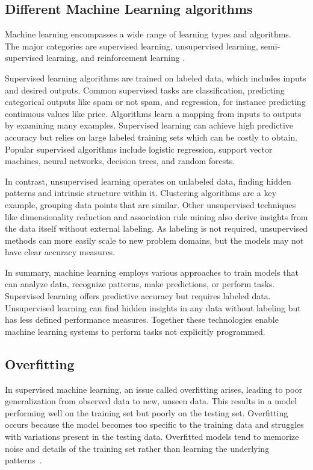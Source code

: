 \subsection{Different Machine Learning algorithms}
Machine learning encompasses a wide range of learning types and algorithms. The major categories are supervised learning, unsupervised learning, semi-supervised learning, and reinforcement learning \cite{Alpaydin14}.

Supervised learning algorithms are trained on labeled data, which includes inputs and desired outputs. Common supervised tasks are classification, predicting categorical outputs like spam or not spam,
and regression, for instance predicting continuous values like price. Algorithms learn a mapping from inputs
to outputs by examining many examples. Supervised learning can achieve high 
predictive accuracy but relies on large labeled training sets which can be costly to obtain. 
Popular supervised algorithms include logistic regression, support vector machines, neural networks, decision trees, and random forests.

In contrast, unsupervised learning operates on unlabeled data, finding hidden patterns and intrinsic structure within it. Clustering algorithms are a key example, grouping data points that are similar. Other unsupervised techniques like dimensionality reduction and association rule mining also derive insights from the data itself without external labeling. As labeling is not required, unsupervised methods can more easily scale to new problem domains, but the models may not have clear accuracy measures.

In summary, machine learning employs various approaches to train models that can analyze data, recognize patterns, make predictions, or perform tasks. Supervised learning offers predictive accuracy but requires labeled data. Unsupervised learning can find hidden insights in any data without labeling but has less defined performance measures. Together these technologies enable machine learning systems to perform tasks not explicitly programmed.



\subsection{Overfitting}
\label{sec:overfit}


In supervised machine learning, an issue called overfitting arises, leading to poor generalization from observed data to new, unseen data. This results in a model performing well on the training set but poorly on the testing set. Overfitting occurs because the model becomes too specific to the training data and struggles with variations present in the testing data. Overfitted models tend to memorize noise and details of the training set rather than learning the underlying patterns~\cite{Ying_2019}.

